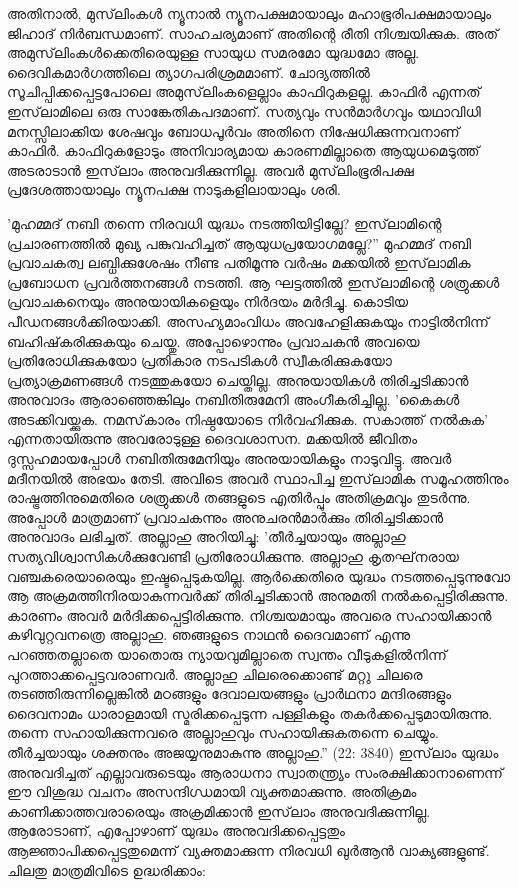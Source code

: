 അതിനാല്‍, മുസ്‌ലിംകള്‍ ന്യൂനാല്‍ ന്യൂനപക്ഷമായാലും മഹാഭൂരിപക്ഷമായാലും ജിഹാദ് നിര്‍ബന്ധമാണ്. സാഹചര്യമാണ് അതിന്റെ രീതി നിശ്ചയിക്കുക. അത് അമുസ്‌ലിംകള്‍ക്കെതിരെയുള്ള സായുധ സമരമോ യുദ്ധമോ അല്ല. ദൈവികമാര്‍ഗത്തിലെ ത്യാഗപരിശ്രമമാണ്.
ചോദ്യത്തില്‍ സൂചിപ്പിക്കപ്പെട്ടപോലെ അമുസ്‌ലിംകളെല്ലാം കാഫിറുകളല്ല. കാഫിര്‍ എന്നത് ഇസ്‌ലാമിലെ ഒരു സാങ്കേതികപദമാണ്. സത്യവും സന്‍മാര്‍ഗവും യഥാവിധി മനസ്സിലാക്കിയ ശേഷവും ബോധപൂര്‍വം അതിനെ നിഷേധിക്കുന്നവനാണ് കാഫിര്‍. കാഫിറുകളോടും അനിവാര്യമായ കാരണമില്ലാതെ ആയുധമെടുത്ത് അടരാടാന്‍ ഇസ്‌ലാം അനുവദിക്കുന്നില്ല. അവര്‍ മുസ്‌ലിംഭൂരിപക്ഷ പ്രദേശത്തായാലും ന്യൂനപക്ഷ നാടുകളിലായാലും ശരി.

'മുഹമ്മദ് നബി തന്നെ നിരവധി യുദ്ധം നടത്തിയിട്ടില്ലേ? ഇസ്‌ലാമിന്റെ പ്രചാരണത്തില്‍ മുഖ്യ പങ്കുവഹിച്ചത് ആയുധപ്രയോഗമല്ലേ?''
മുഹമ്മദ് നബി പ്രവാചകത്വ ലബ്ധിക്കുശേഷം നീണ്ട പതിമൂന്നു വര്‍ഷം മക്കയില്‍ ഇസ്‌ലാമിക പ്രബോധന പ്രവര്‍ത്തനങ്ങള്‍ നടത്തി. ആ ഘട്ടത്തില്‍ ഇസ്‌ലാമിന്റെ ശത്രുക്കള്‍ പ്രവാചകനെയും അനുയായികളെയും നിര്‍ദയം മര്‍ദിച്ചു. കൊടിയ പീഡനങ്ങള്‍ക്കിരയാക്കി. അസഹ്യമാംവിധം അവഹേളിക്കുകയും നാട്ടില്‍നിന്ന് ബഹിഷ്‌കരിക്കുകയും ചെയ്തു. അപ്പോഴൊന്നും പ്രവാചകന്‍ അവയെ പ്രതിരോധിക്കുകയോ പ്രതികാര നടപടികള്‍ സ്വീകരിക്കുകയോ പ്രത്യാക്രമണങ്ങള്‍ നടത്തുകയോ ചെയ്തില്ല. അനുയായികള്‍ തിരിച്ചടിക്കാന്‍ അനുവാദം ആരാഞ്ഞെങ്കിലും നബിതിരുമേനി അംഗീകരിച്ചില്ല. 'കൈകള്‍ അടക്കിവയ്ക്കുക. നമസ്‌കാരം നിഷ്ഠയോടെ നിര്‍വഹിക്കുക. സകാത്ത് നല്‍കുക' എന്നതായിരുന്നു അവരോടുള്ള ദൈവശാസന.
മക്കയില്‍ ജീവിതം ദുസ്സഹമായപ്പോള്‍ നബിതിരുമേനിയും അനുയായികളും നാടുവിട്ടു. അവര്‍ മദീനയില്‍ അഭയം തേടി. അവിടെ അവര്‍ സ്ഥാപിച്ച ഇസ്‌ലാമിക സമൂഹത്തിനും രാഷ്ട്രത്തിനുമെതിരെ ശത്രുക്കള്‍ തങ്ങളുടെ എതിര്‍പ്പും അതിക്രമവും തുടര്‍ന്നു. അപ്പോള്‍ മാത്രമാണ് പ്രവാചകന്നും അനുചരന്‍മാര്‍ക്കും തിരിച്ചടിക്കാന്‍ അനുവാദം ലഭിച്ചത്. അല്ലാഹു അറിയിച്ചു: 'തീര്‍ച്ചയായും അല്ലാഹു സത്യവിശ്വാസികള്‍ക്കുവേണ്ടി പ്രതിരോധിക്കുന്നു. അല്ലാഹു കൃതഘ്‌നരായ വഞ്ചകരെയാരെയും ഇഷ്ടപ്പെടുകയില്ല. ആര്‍ക്കെതിരെ യുദ്ധം നടത്തപ്പെടുന്നുവോ ആ അക്രമത്തിനിരയാകുന്നവര്‍ക്ക് തിരിച്ചടിക്കാന്‍ അനുമതി നല്‍കപ്പെട്ടിരിക്കുന്നു. കാരണം അവര്‍ മര്‍ദിക്കപ്പെട്ടിരിക്കുന്നു. നിശ്ചയമായും അവരെ സഹായിക്കാന്‍ കഴിവുറ്റവനത്രെ അല്ലാഹു. ഞങ്ങളുടെ നാഥന്‍ ദൈവമാണ് എന്നു പറഞ്ഞതല്ലാതെ യാതൊരു ന്യായവുമില്ലാതെ സ്വന്തം വീടുകളില്‍നിന്ന് പുറത്താക്കപ്പെട്ടവരാണവര്‍. അല്ലാഹു ചിലരെക്കൊണ്ട് മറ്റു ചിലരെ തടഞ്ഞിരുന്നില്ലെങ്കില്‍ മഠങ്ങളും ദേവാലയങ്ങളും പ്രാര്‍ഥനാ മന്ദിരങ്ങളും ദൈവനാമം ധാരാളമായി സ്മരിക്കപ്പെടുന്ന പള്ളികളും തകര്‍ക്കപ്പെടുമായിരുന്നു. തന്നെ സഹായിക്കുന്നവരെ അല്ലാഹുവും സഹായിക്കുകതന്നെ ചെയ്യും. തീര്‍ച്ചയായും ശക്തനും അജയ്യനുമാകുന്നു അല്ലാഹു.'' (22: 3840)
ഇസ്‌ലാം യുദ്ധം അനുവദിച്ചത് എല്ലാവരുടെയും ആരാധനാ സ്വാതന്ത്യ്രം സംരക്ഷിക്കാനാണെന്ന് ഈ വിശുദ്ധ വചനം അസന്ദിഗ്ധമായി വ്യക്തമാക്കുന്നു.
അതിക്രമം കാണിക്കാത്തവരാരെയും അക്രമിക്കാന്‍ ഇസ്‌ലാം അനുവദിക്കുന്നില്ല. ആരോടാണ്, എപ്പോഴാണ് യുദ്ധം അനുവദിക്കപ്പെട്ടതും ആജ്ഞാപിക്കപ്പെട്ടതുമെന്ന് വ്യക്തമാക്കുന്ന നിരവധി ഖുര്‍ആന്‍ വാക്യങ്ങളുണ്ട്. ചിലതു മാത്രമിവിടെ ഉദ്ധരിക്കാം:

